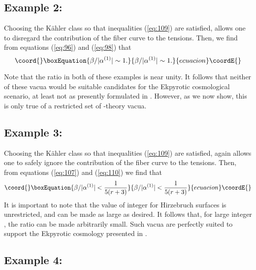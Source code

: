 \documentclass[a4paper,12pt]{article}
\numberwithin{equation}{section}
\theoremstyle{plain}
\begin{document}
\subsection*{Example 2:}

Choosing the K\"{a}hler class so that inequalities (\ref{eq:109}) are satisfied,
allows one to disregard the contribution of the fiber curve to the
tensions. Then, we find from equations (\ref{eq:96}) and (\ref{eq:98}) that
%
\begin{equation}\coord{}\boxEquation{
\beta/|\alpha^{(1)}|\sim 1.
\label{eq:128}
}{
\beta/|\alpha^{(1)}|\sim 1.
}{ecuacion}\coordE{}\end{equation}
%

Note that the \coordHE{} ratio in both of these examples is near
unity. It follows that neither of these vacua would be suitable candidates for
the Ekpyrotic cosmological scenario, at least not as presently formulated
in \cite{EU}. However, as we now show, this is only true of a restricted 
set of \coordHE{}-theory vacua.

\subsection*{Example 3:}

Choosing the K\"{a}hler class so that inequalities (\ref{eq:109}) are satisfied,
again allows one to safely ignore the contribution of the fiber curve to the
tensions. Then, from equations (\ref{eq:107}) and (\ref{eq:110}) we find that
%
\begin{equation}\coord{}\boxEquation{
\beta/|\alpha^{(1)}| < \frac{1}{5(r+3)}
\label{eq:129}
}{
\beta/|\alpha^{(1)}| < \frac{1}{5(r+3)}
}{ecuacion}\coordE{}\end{equation}
%
It is important to note that the value of integer \coordHE{} for Hirzebruch surfaces
\coordHE{} is unrestricted, and can be made as large as desired. It follows that,
for large integer \coordHE{}, the \coordHE{} ratio can be made arbitrarily 
small.  Such vacua are perfectly suited to support the Ekpyrotic cosmology
presented in \cite{EU}.

\subsection*{Example 4:}
\end{document}
